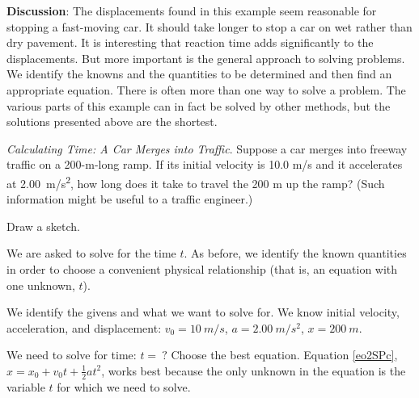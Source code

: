 \documentclass[../../main-ap-physics.tex]{subfiles}
\begin{document}
\textbf{Discussion}: The displacements found in this example seem reasonable for stopping a fast-moving car. It should take longer to stop a car on wet rather than dry pavement. It is interesting that reaction time adds significantly to the displacements. But more important is the general approach to solving problems. We identify the knowns and the quantities to be determined and then find an appropriate equation. There is often more than one way to solve a problem. The various parts of this example can in fact be solved by other methods, but the solutions presented above are the shortest.

\endsolution

\begin{example}
    \textit{Calculating Time: A Car Merges into Traffic}. Suppose a car merges into freeway traffic on a 200-m-long ramp. If its initial velocity is 10.0 m/s and it accelerates at \SI{2.00}{m/s^2}, how long does it take to travel the 200 m up the ramp? (Such information might be useful to a traffic engineer.)
\end{example}

\Solution Draw a sketch.

\begin{center}
\end{center}

We are asked to solve for the time $t$. As before, we identify the known quantities in order to choose a convenient physical relationship (that is, an equation with one unknown, $t$).

\vspace{1em}

We identify the givens and what we want to solve for. We know initial velocity, acceleration, and displacement: $v_0 = \SI{10}{m/s}$, $a = \SI{2.00}{m/s^2}$, $x = \SI{200}{m}$. 

\vspace{1em}

We need to solve for time: $t =\ ?$ Choose the best equation. Equation \eqref{eo2SPc}, $x = x_0 + v_0 t + \frac{1}{2} a t^2$, works best because the only unknown in the equation is the variable $t$ for which we need to solve.
\end{document}
